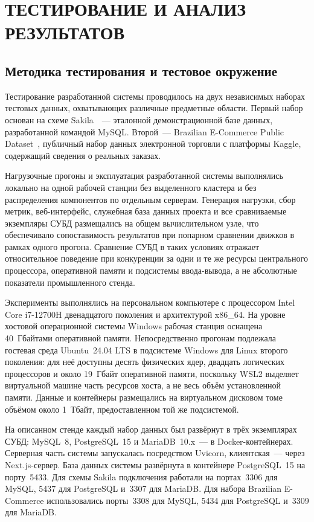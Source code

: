 \section{ТЕСТИРОВАНИЕ И АНАЛИЗ РЕЗУЛЬТАТОВ}

\subsection{Методика тестирования и тестовое окружение}

Тестирование разработанной системы проводилось на двух независимых наборах тестовых данных, охватывающих различные предметные области. Первый набор основан на схеме Sakila~\cite{sakila_db}~--- эталонной демонстрационной базе данных, разработанной командой MySQL. Второй~--- Brazilian E-Commerce Public Dataset~\cite{olist_dataset}, публичный набор данных электронной торговли с платформы Kaggle, содержащий сведения о реальных заказах.

Нагрузочные прогоны и эксплуатация разработанной системы выполнялись локально на одной рабочей станции без выделенного кластера и без распределения компонентов по отдельным серверам. Генерация нагрузки, сбор метрик, веб-интерфейс, служебная база данных проекта и все сравниваемые экземпляры СУБД размещались на общем вычислительном узле, что обеспечивало сопоставимость результатов при попарном сравнении движков в рамках одного прогона. Сравнение СУБД в таких условиях отражает относительное поведение при конкуренции за одни и те же ресурсы центрального процессора, оперативной памяти и подсистемы ввода-вывода, а не абсолютные показатели промышленного стенда.

Эксперименты выполнялись на персональном компьютере с процессором Intel Core i7-12700H двенадцатого поколения и архитектурой x86\_64. На уровне хостовой операционной системы Windows рабочая станция оснащена 40~Гбайтами оперативной памяти. Непосредственно прогонам подлежала гостевая среда Ubuntu~24.04 LTS в подсистеме Windows для Linux второго поколения: для неё доступны десять физических ядер, двадцать логических процессоров и около 19~Гбайт оперативной памяти, поскольку WSL2 выделяет виртуальной машине часть ресурсов хоста, а не весь объём установленной памяти. Данные и контейнеры размещались на виртуальном дисковом томе объёмом около 1~Тбайт, предоставленном той же подсистемой.

На описанном стенде каждый набор данных был развёрнут в трёх экземплярах СУБД: MySQL~8, PostgreSQL~15 и MariaDB~10.x~--- в Docker-контейнерах. Серверная часть системы запускалась посредством Uvicorn, клиентская~--- через Next.js-сервер. База данных системы развёрнута в контейнере PostgreSQL~15 на порту~5433. Для схемы Sakila подключения работали на портах~3306 для MySQL, 5437 для PostgreSQL и~3307 для MariaDB. Для набора Brazilian E-Commerce использовались порты~3308 для MySQL, 5434 для PostgreSQL и~3309 для MariaDB.

